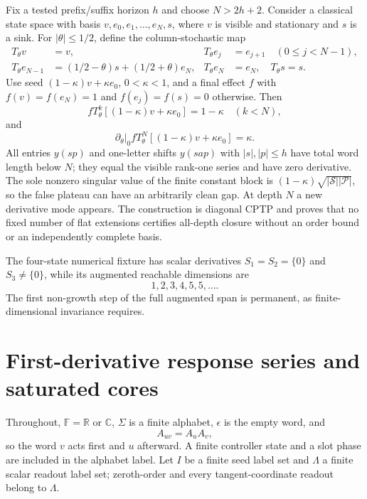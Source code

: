 \documentclass[aps,prl,reprint,superscriptaddress,nofootinbib]{revtex4-2}
\newcommand{\R}{\mathbb R}
\newcommand{\C}{\mathbb C}
\newcommand{\F}{\mathbb F}
\newcommand{\cP}{\mathcal P}
\newcommand{\cS}{\mathcal S}
\begin{document}
Fix a tested prefix/suffix horizon $h$ and choose $N>2h+2$.  Consider a classical state space with basis $v,e_0,e_1,\ldots,e_N,s$, where $v$ is visible and stationary and $s$ is a sink.  For $|\theta|\le1/2$, define the column-stochastic map
\begin{align}
 T_\theta v&=v,&
 T_\theta e_j&=e_{j+1}\quad(0\le j<N-1),\nonumber\\
 T_\theta e_{N-1}&=(1/2-\theta)s+(1/2+\theta)e_N,&
 T_\theta e_N&=e_N,
 \quad T_\theta s=s.
 \label{eq:delayed-map}
\end{align}
Use seed $(1-\kappa)v+\kappa e_0$, $0<\kappa<1$, and a final effect $f$ with $f(v)=f(e_N)=1$ and $f(e_j)=f(s)=0$ otherwise.  Then
\begin{equation}
 fT_\theta^k[(1-\kappa)v+\kappa e_0]=1-\kappa\quad(k<N),
 \label{eq:delayed-flat}
\end{equation}
and
\begin{equation}
 \left.\partial_\theta\right|_0
 fT_\theta^N[(1-\kappa)v+\kappa e_0]=\kappa.
 \label{eq:delayed-growth}
\end{equation}
All entries $y(sp)$ and one-letter shifts $y(sap)$ with $|s|,|p|\le h$ have total word length below $N$; they equal the visible rank-one series and have zero derivative.  The sole nonzero singular value of the finite constant block is $(1-\kappa)\sqrt{|\cS||\cP|}$, so the false plateau can have an arbitrarily clean gap.  At depth $N$ a new derivative mode appears.  The construction is diagonal CPTP and proves that no fixed number of flat extensions certifies all-depth closure without an order bound or an independently complete basis.

The four-state numerical fixture has scalar derivatives $S_1=S_2=\{0\}$ and $S_3\ne\{0\}$, while its augmented reachable dimensions are
\begin{equation}
 1,2,3,4,5,5,\ldots .
 \label{eq:jet-dims-validation}
\end{equation}
The first non-growth step of the full augmented span is permanent, as finite-dimensional invariance requires.

\section{First-derivative response series and saturated cores}
\label{sec:definitions}

Throughout, $\F=\R$ or $\C$, $\Sigma$ is a finite alphabet, $\epsilon$ is the empty word, and
\begin{equation}
 A_{uv}=A_uA_v,
 \label{eq:word-convention}
\end{equation}
so the word $v$ acts first and $u$ afterward.  A finite controller state and a slot phase are included in the alphabet label.  Let $I$ be a finite seed label set and $\Lambda$ a finite scalar readout label set; zeroth-order and every tangent-coordinate readout belong to $\Lambda$.
\end{document}
